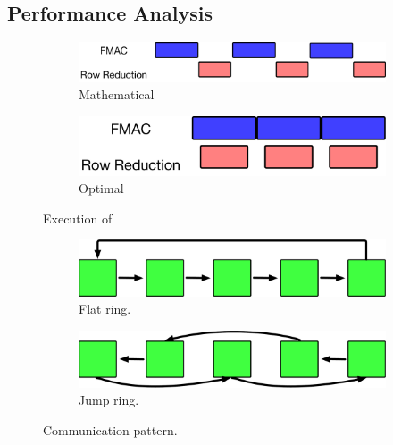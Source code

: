 \subsection{Performance Analysis}

\begin{figure}[t!]
  \centering
  \begin{subfigure}{0.48\columnwidth}
    \includegraphics[width=\linewidth]{figures/gemm_A_C_memory_master/4.pdf}
    \caption{Mathematical}
  \end{subfigure}
  \hfill
  \begin{subfigure}{0.48\columnwidth}
    \includegraphics[width=\linewidth]{figures/gemm_A_C_memory_master/41.pdf}
    \caption{Optimal}
  \end{subfigure}
  \caption{Execution of \master}
  \label{fig:gemm_master_4}
\end{figure}


\begin{figure}[t!]
  \centering
  \begin{subfigure}{0.40\columnwidth}
    \includegraphics[width=\linewidth]{figures/gemm_A_C_memory_master/5.pdf}
    \caption{Flat ring.}
  \end{subfigure}
  \hfill
  \begin{subfigure}{0.40\columnwidth}
    \includegraphics[width=\linewidth]{figures/gemm_A_C_memory_master/6.pdf}
    \caption{Jump ring.}
  \end{subfigure}
  \caption{Communication pattern.}
  \label{fig:gemm_master_5_6}
\end{figure}



